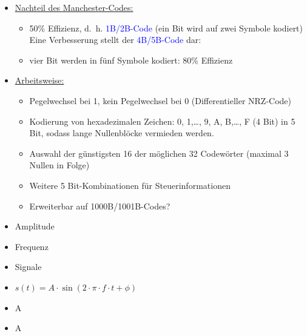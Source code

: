 \begin{itemize}
    \item \underline{Nachteil des Manchester-Codes:}
    \begin{itemize}
        \item 50\% Effizienz, d.\ h. \textcolor{blue}{1B/2B-Code} (ein Bit wird auf zwei Symbole kodiert)
        Eine Verbesserung stellt der \textcolor{blue}{4B/5B-Code} dar:
        \item vier Bit werden in fünf Symbole kodiert: 80\% Effizienz
    \end{itemize}
    \item \underline{Arbeitsweise:}
    \begin{itemize}
        \item Pegelwechsel bei 1, kein Pegelwechsel bei 0 (Differentieller NRZ-Code)
        \item Kodierung von hexadezimalen Zeichen: 0, 1,\ldots, 9, A, B,\ldots, F (4 Bit)
        in 5 Bit, sodass lange Nullenblöcke vermieden werden.
        \item Auswahl der günstigsten 16 der möglichen 32 Codewörter
        (maximal 3 Nullen in Folge)
        \item Weitere 5 Bit-Kombinationen für Steuerinformationen
        \item Erweiterbar auf 1000B/1001B-Codes?
    \end{itemize}
\end{itemize}

\begin{itemize}
    \item Amplitude
    \item Frequenz
    \item Signale
    \item $s(t) = A \cdot \sin(2 \cdot \pi \cdot f \cdot t + \phi)$
\end{itemize}

\begin{itemize}
    \item \todo A
\end{itemize}

\begin{itemize}
    \item \todo A
\end{itemize}

